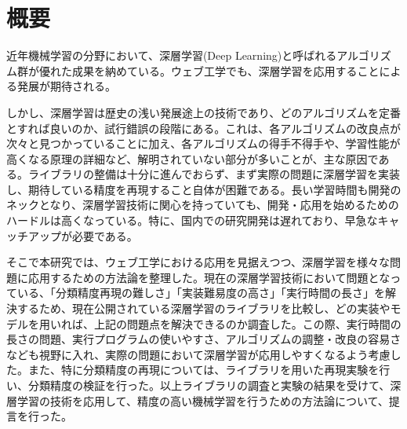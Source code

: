 \chapter*{概要}
近年機械学習の分野において、深層学習(Deep Learning)と呼ばれるアルゴリズム群が優れた成果を納めている。ウェブ工学でも、深層学習を応用することによる発展が期待される。\par
しかし、深層学習は歴史の浅い発展途上の技術であり、どのアルゴリズムを定番とすれば良いのか、試行錯誤の段階にある。これは、各アルゴリズムの改良点が次々と見つかっていることに加え、各アルゴリズムの得手不得手や、学習性能が高くなる原理の詳細など、解明されていない部分が多いことが、主な原因である。ライブラリの整備は十分に進んでおらず、まず実際の問題に深層学習を実装し、期待している精度を再現すること自体が困難である。長い学習時間も開発のネックとなり、深層学習技術に関心を持っていても、開発・応用を始めるためのハードルは高くなっている。特に、国内での研究開発は遅れており、早急なキャッチアップが必要である。\par
そこで本研究では、ウェブ工学における応用を見据えつつ、深層学習を様々な問題に応用するための方法論を整理した。現在の深層学習技術において問題となっている、「分類精度再現の難しさ」「実装難易度の高さ」「実行時間の長さ」を解決するため、現在公開されている深層学習のライブラリを比較し、どの実装やモデルを用いれば、上記の問題点を解決できるのか調査した。この際、実行時間の長さの問題、実行プログラムの使いやすさ、アルゴリズムの調整・改良の容易さなども視野に入れ、実際の問題において深層学習が応用しやすくなるよう考慮した。また、特に分類精度の再現については、ライブラリを用いた再現実験を行い、分類精度の検証を行った。以上ライブラリの調査と実験の結果を受けて、深層学習の技術を応用して、精度の高い機械学習を行うための方法論について、提言を行った。